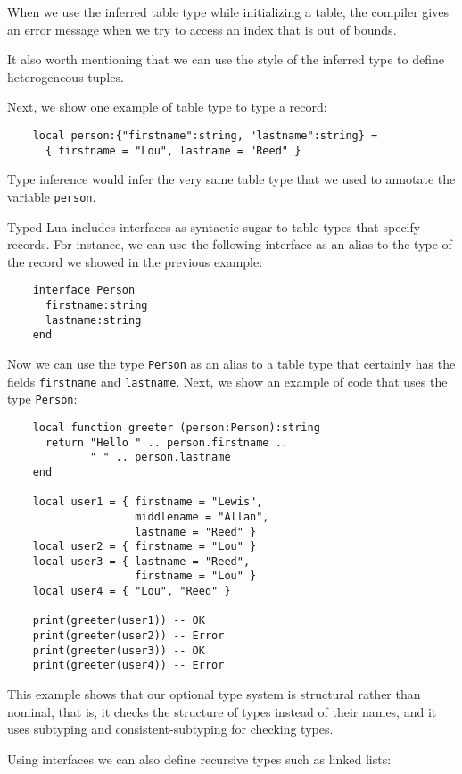 When we use the inferred table type while initializing a table, the
compiler gives an error message when we try to access an index that
is out of bounds.

It also worth mentioning that we can use the style of the inferred
type to define heterogeneous tuples.

Next, we show one example of table type to type a record:
\begin{verbatim}
    local person:{"firstname":string, "lastname":string} =
      { firstname = "Lou", lastname = "Reed" } 
\end{verbatim}

Type inference would infer the very same table type that we used to
annotate the variable \texttt{person}.

Typed Lua includes interfaces as syntactic sugar to table types
that specify records.
For instance, we can use the following interface as an alias to the
type of the record we showed in the previous example:
\begin{verbatim}
    interface Person
      firstname:string
      lastname:string
    end
\end{verbatim}

Now we can use the type \texttt{Person} as an alias to a table type
that certainly has the fields \texttt{firstname} and \texttt{lastname}.
Next, we show an example of code that uses the type \texttt{Person}:
\begin{verbatim}
    local function greeter (person:Person):string
      return "Hello " .. person.firstname ..
             " " .. person.lastname
    end

    local user1 = { firstname = "Lewis",
                    middlename = "Allan",
                    lastname = "Reed" }
    local user2 = { firstname = "Lou" }
    local user3 = { lastname = "Reed",
                    firstname = "Lou" }
    local user4 = { "Lou", "Reed" }

    print(greeter(user1)) -- OK
    print(greeter(user2)) -- Error
    print(greeter(user3)) -- OK
    print(greeter(user4)) -- Error
\end{verbatim}

This example shows that our optional type system is structural rather
than nominal, that is, it checks the structure of types instead of
their names, and it uses subtyping and consistent-subtyping for
checking types.

Using interfaces we can also define recursive types such as linked
lists:

